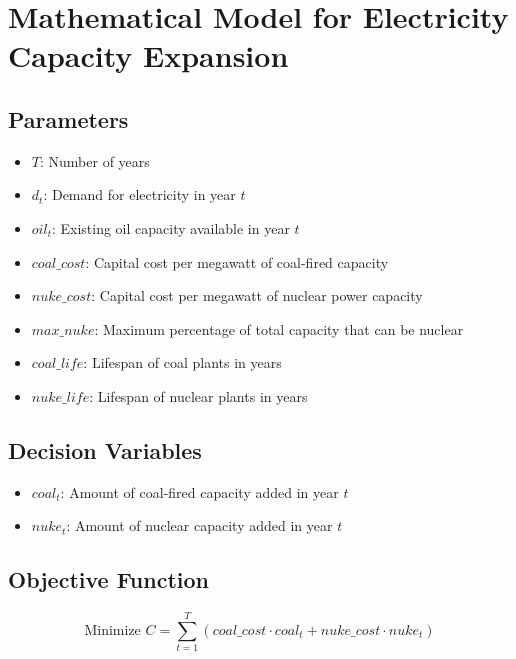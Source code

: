 \documentclass{article}
\begin{document}
\section*{Mathematical Model for Electricity Capacity Expansion}

\subsection*{Parameters}
\begin{itemize}
    \item \( T \): Number of years
    \item \( d_t \): Demand for electricity in year \( t \)
    \item \( oil_t \): Existing oil capacity available in year \( t \)
    \item \( coal\_cost \): Capital cost per megawatt of coal-fired capacity
    \item \( nuke\_cost \): Capital cost per megawatt of nuclear power capacity
    \item \( max\_nuke \): Maximum percentage of total capacity that can be nuclear
    \item \( coal\_life \): Lifespan of coal plants in years
    \item \( nuke\_life \): Lifespan of nuclear plants in years
\end{itemize}

\subsection*{Decision Variables}
\begin{itemize}
    \item \( coal_t \): Amount of coal-fired capacity added in year \( t \)
    \item \( nuke_t \): Amount of nuclear capacity added in year \( t \)
\end{itemize}

\subsection*{Objective Function}
\[
\text{Minimize } C = \sum_{t=1}^{T} (coal\_cost \cdot coal_t + nuke\_cost \cdot nuke_t)
\]
\end{document}

